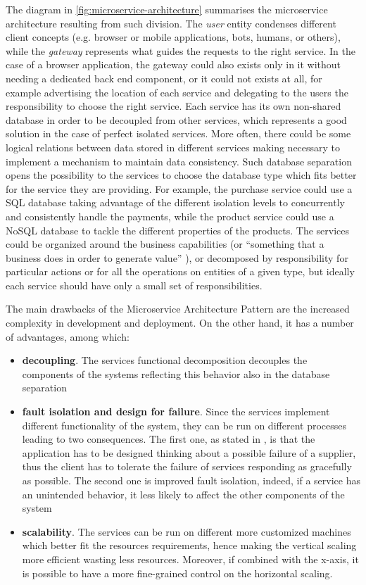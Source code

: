 The diagram in \autoref{fig:microservice-architecture} summarises the
microservice architecture resulting from such division. The \emph{user} entity
condenses different client concepts (e.g. browser or mobile applications, bots,
humans, or others), while the \emph{gateway} represents what guides the requests
to the right service. In the case of a browser application, the gateway could
also exists only in it without needing a dedicated back end component, or it
could not exists at all, for example advertising the location of each service
and delegating to the users the responsibility to choose the right service. Each
service has its own non-shared database in order to be decoupled from other
services, which represents a good solution in the case of perfect isolated
services. More often, there could be some logical relations between data stored
in different services making necessary to implement a mechanism to maintain data
consistency. Such database separation opens the possibility to the services to
choose the database type which fits better for the service they are providing.
For example, the purchase service could use a SQL database taking advantage of
the different isolation levels to concurrently and consistently handle the
payments, while the product service could use a NoSQL database to tackle the
different properties of the products. The services could be organized around the
business capabilities (or ``something that a business does in order to generate
value'' \cite{bib:decompose-business-capability}), or decomposed by
responsibility for particular actions or for all the operations on entities of a
given type, but ideally each service should have only a small set of
responsibilities.

The main drawbacks of the Microservice Architecture Pattern
\cite{bib:microservice-architecture} are the increased complexity in development
and deployment. On the other hand, it has a number of advantages, among which:

\begin{itemize}
	\item \textbf{decoupling}. The services functional decomposition decouples the
	components of the systems reflecting this behavior also in the database
	separation
	\item \textbf{fault isolation and design for failure}. Since the services
	implement different functionality of the system, they can be run on different
	processes leading to two consequences. The first one, as stated in
	\cite{bib:microservices-martin-fowler}, is that the application has to be
	designed thinking about a possible failure of a supplier, thus the client has
	to tolerate the failure of services responding as gracefully as possible. The
	second one is improved fault isolation, indeed, if a service has an unintended
	behavior, it less likely to affect the other components of the system
	\item \textbf{scalability}. The services can be run on different more
	customized machines which better fit the resources requirements, hence making
	the vertical scaling more efficient wasting less resources. Moreover, if
	combined with the x-axis, it is possible to have a more fine-grained control
	on the horizontal scaling.
\end{itemize}


